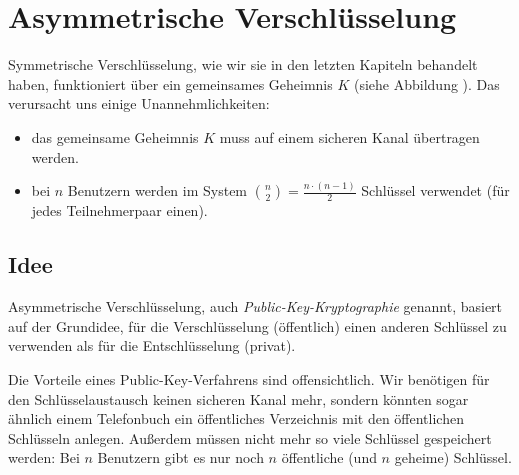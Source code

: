 \chapter{Asymmetrische Verschlüsselung}
\label{ch:asymmenc}

Symmetrische Verschlüsselung, wie wir sie in den letzten Kapiteln behandelt haben, funktioniert über ein gemeinsames Geheimnis $K$ (siehe Abbildung
).
Das verursacht uns einige Unannehmlichkeiten:

\begin{itemize}
  \item das gemeinsame Geheimnis $K$ muss auf einem sicheren Kanal übertragen werden.
  \item bei $n$ Benutzern werden im System $\binom{n}{2} = \frac{n \cdot (n-1)}{2}$ Schlüssel verwendet (für jedes Teilnehmerpaar einen).
\end{itemize}

%






\section{Idee}
Asymmetrische Verschlüsselung, auch \emph{Public-Key-Kryptographie}
genannt,  basiert auf der Grundidee, für die Verschlüsselung
(öffentlich) einen anderen Schlüssel zu verwenden als für die
Entschlüsselung (privat).

Die Vorteile eines Public-Key-Verfahrens sind offensichtlich. Wir
benötigen für den Schlüsselaustausch keinen sicheren Kanal mehr, sondern
könnten sogar ähnlich einem Telefonbuch ein öffentliches Verzeichnis mit
den öffentlichen Schlüsseln anlegen. Außerdem müssen nicht mehr so viele
Schlüssel gespeichert werden: Bei $n$ Benutzern gibt es nur noch $n$
öffentliche (und $n$ geheime) Schlüssel. 

